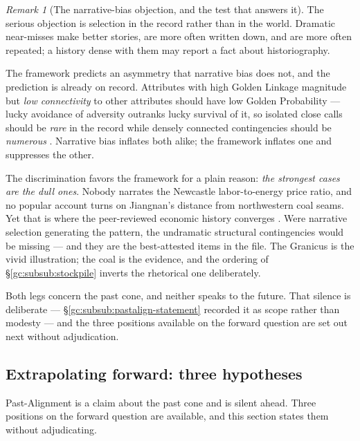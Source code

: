 \documentclass[11pt]{article}
\numberwithin{equation}{section}
\theoremstyle{plain}
\theoremstyle{definition}
\theoremstyle{remark}
\newtheorem{remark}[theorem]{Remark}
\begin{document}
\begin{remark}[The narrative-bias objection, and the test that answers
it]\label{gc:rem:narrativebias}
The serious objection is selection in the record rather than in the
world. Dramatic near-misses make better stories, are more often written
down, and are more often repeated; a history dense with them may report
a fact about historiography.

The framework predicts an asymmetry that narrative bias does not, and
the prediction is already on record. Attributes with high Golden Linkage
magnitude but \emph{low connectivity} to other attributes should have
low Golden Probability --- lucky avoidance of adversity outranks lucky
survival of it, so isolated close calls should be \emph{rare} in the
record while densely connected contingencies should be
\emph{numerous} \cite{GoldenScience22}. Narrative bias inflates both
alike; the framework inflates one and suppresses the other.

The discrimination favors the framework for a plain reason: \emph{the strongest cases are the dull ones}. Nobody narrates
the Newcastle labor-to-energy price ratio, and no popular account turns
on Jiangnan's distance from northwestern coal seams. Yet that is where
the peer-reviewed economic history converges \cite{Pomeranz00,
Allen09}. Were narrative selection generating the pattern, the
undramatic structural contingencies would be missing --- and they are
the best-attested items in the file. The Granicus is the vivid
illustration; the coal is the evidence, and the ordering of
\S\ref{gc:subsub:stockpile} inverts the rhetorical one deliberately.
\end{remark}


Both legs concern the past cone, and neither speaks to the future. That
silence is deliberate --- \S\ref{gc:subsub:pastalign-statement} recorded
it as scope rather than modesty --- and the three positions available on
the forward question are set out next without adjudication.

\subsection{Extrapolating forward: three hypotheses}
\label{gc:sub:extrapolation}

Past-Alignment is a claim about the past cone and is silent ahead. Three
positions on the forward question are available, and this section states
them without adjudicating.
\end{document}

